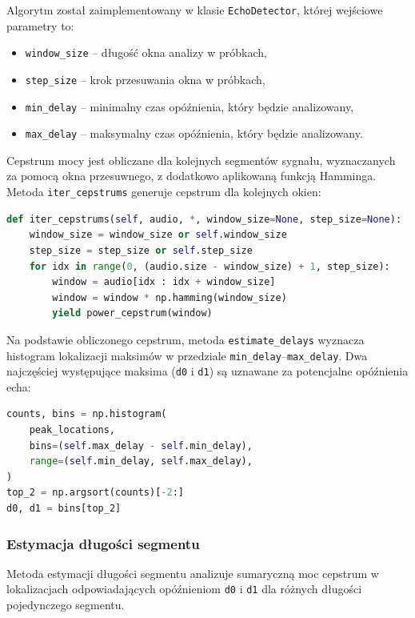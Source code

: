 Algorytm został zaimplementowany w klasie \verb|EchoDetector|, której wejściowe parametry to:
\begin{itemize}
	\item \verb|window_size| -- długość okna analizy w próbkach,
	\item \verb|step_size| -- krok przesuwania okna w próbkach,
	\item \verb|min_delay| -- minimalny czas opóźnienia, który będzie analizowany,
	\item \verb|max_delay| -- maksymalny czas opóźnienia, który będzie analizowany.
\end{itemize}

Cepstrum mocy jest obliczane dla kolejnych segmentów sygnału, wyznaczanych za pomocą okna przesuwnego, z dodatkowo aplikowaną funkcją Hamminga. Metoda \verb|iter_cepstrums| generuje cepstrum dla kolejnych okien:

\begin{lstlisting}[language=Python]
def iter_cepstrums(self, audio, *, window_size=None, step_size=None):
    window_size = window_size or self.window_size
    step_size = step_size or self.step_size
    for idx in range(0, (audio.size - window_size) + 1, step_size):
        window = audio[idx : idx + window_size]
        window = window * np.hamming(window_size)
        yield power_cepstrum(window)
\end{lstlisting}

Na podstawie obliczonego cepstrum, metoda \verb|estimate_delays| wyznacza histogram lokalizacji maksimów w przedziale \verb|min_delay|--\verb|max_delay|. Dwa najczęściej występujące maksima (\verb|d0| i \verb|d1|) są uznawane za potencjalne opóźnienia echa:

\begin{lstlisting}[language=Python]
counts, bins = np.histogram(
    peak_locations,
    bins=(self.max_delay - self.min_delay),
    range=(self.min_delay, self.max_delay),
)
top_2 = np.argsort(counts)[-2:]
d0, d1 = bins[top_2]
\end{lstlisting}

\subsubsection{Estymacja długości segmentu}

Metoda estymacji długości segmentu analizuje sumaryczną moc cepstrum w lokalizacjach odpowiadających opóźnieniom \verb|d0| i \verb|d1| dla różnych długości pojedynczego segmentu.

